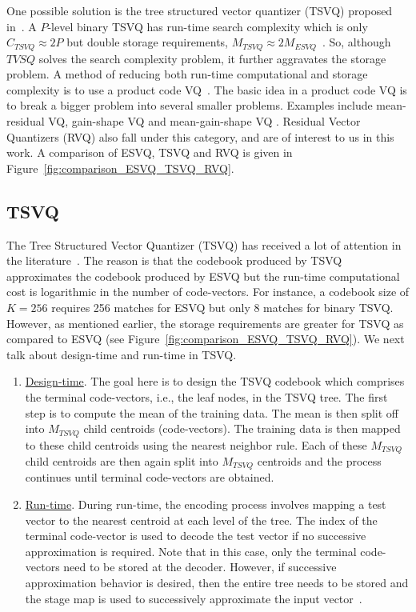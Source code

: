 One possible solution is the tree structured vector quantizer (TSVQ) proposed in~\cite{1980_JNL_TSVQ_Buzo}.  A $P$-level binary TSVQ has run-time search complexity which is only $C_{TSVQ} \approx 2P$ but double storage requirements, $M_{TSVQ} \approx 2 M_{ESVQ}$~\cite{1996_JNL_AdvancesRVQ_Barnes}.   So, although $TVSQ$ solves the search complexity problem, it further aggravates the storage problem.  A method of reducing both run-time computational and storage complexity is to use a product code VQ~\cite{1991_BOOK_VQ_GershoGray}.  The basic idea in a product code VQ is to break a bigger problem into several smaller problems.  Examples include mean-residual VQ, gain-shape VQ and mean-gain-shape VQ \cite{1996_JNL_AdvancesRVQ_Barnes}.  Residual Vector Quantizers (RVQ) also fall under this category, and are of interest to us in this work.  A comparison of ESVQ, TSVQ and RVQ is given in Figure~\ref{fig:comparison_ESVQ_TSVQ_RVQ}.


\subsection{TSVQ}
The Tree Structured Vector Quantizer (TSVQ) has received a lot of attention in the literature~\cite{1991_BOOK_VQ_GershoGray}.  The reason is that the codebook produced by TSVQ approximates the codebook produced by ESVQ but the run-time computational cost is logarithmic in the number of code-vectors.   For instance, a codebook size of $K=256$ requires 256 matches for ESVQ but only 8 matches for binary TSVQ.  However, as mentioned earlier, the storage requirements are greater for TSVQ as compared to ESVQ (see Figure~\ref{fig:comparison_ESVQ_TSVQ_RVQ}).   We next talk about design-time and run-time in TSVQ.

\begin{enumerate} 
\item \underline{Design-time}.  The goal here is to design the TSVQ codebook which comprises the terminal code-vectors, i.e., the leaf nodes, in the TSVQ tree.  The first step is to compute the mean of the training data.  The mean is then split off into $M_{TSVQ}$ child centroids (code-vectors).  The training data is then mapped to these child centroids using the nearest neighbor rule.  Each of these $M_{TSVQ}$ child centroids are then again split into $M_{TSVQ}$ centroids and the process continues until terminal code-vectors are obtained.  

\item \underline{Run-time}.  During run-time, the encoding process involves mapping a test vector to the nearest centroid at each level of the tree.  The index of the terminal code-vector is used to decode the test vector if no successive approximation is required.  Note that in this case,  only the terminal code-vectors need to be stored at the decoder.  However, if successive approximation behavior is desired, then the entire tree needs to be stored and the stage map is used to successively approximate the input vector~\cite{1991_BOOK_VQ_GershoGray}.
\end{enumerate}

